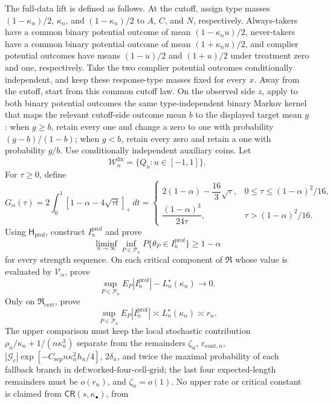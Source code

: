 The full-data lift is defined as follows.  At the cutoff, assign type
masses \((1-\kappa_n)/2\), \(\kappa_n\), and
\((1-\kappa_n)/2\) to \(A\), \(C\), and \(N\), respectively.
Always-takers have a common binary potential outcome of mean
\((1-\kappa_nu)/2\), never-takers have a common binary potential outcome
of mean \((1+\kappa_nu)/2\), and complier potential outcomes have means
\((1-u)/2\) and \((1+u)/2\) under treatment zero and one, respectively.
Take the two complier potential outcomes conditionally independent, and
keep these response-type masses fixed for every \(x\).  Away from the
cutoff, start from this common cutoff law.  On the observed
side \(z\), apply to both binary potential outcomes the same
type-independent binary Markov kernel that maps the relevant cutoff-side
outcome mean \(b\) to the displayed target mean \(g\): when \(g\ge b\),
retain every one and change a zero to one with probability
\((g-b)/(1-b)\); when \(g<b\), retain every zero and retain a one with
probability \(g/b\).  Use conditionally independent auxiliary coins.
Let
\[
 \mathcal W_n^{\mathrm{fix}}=\{Q_u:u\in[-1,1]\}.
\]
For \(\tau\ge0\), define
\[
 G_\alpha(\tau)
 =2\int_0^1[1-\alpha-4\sqrt{\tau t}]_+\,dt
 =\begin{cases}
 2(1-\alpha)-\dfrac{16}{3}\sqrt\tau,
   &0\le\tau\le(1-\alpha)^2/16,\\[6pt]
 \dfrac{(1-\alpha)^3}{24\tau},
   &\tau>(1-\alpha)^2/16.
 \end{cases}
\]
Using \(\mathsf H_{\mathrm{prof}}\), construct \(I_n^{\mathrm{prof}}\)
and prove
\[
 \liminf_{n\to\infty}\inf_{P\in\mathcal P_n}
 P\{\theta_P\in I_n^{\mathrm{prof}}\}\ge1-\alpha
\]
for every strength sequence.  On each critical component of
\(\mathfrak R\) whose value is evaluated by \(\mathcal V_\alpha\), prove
\[
 \sup_{P\in\mathcal P_n}E_P|I_n^{\mathrm{prof}}|
 -L_n^\star(\kappa_n)\longrightarrow0.
\]
Only on \(\mathfrak R_{\mathrm{cert}}\), prove
\[
 \sup_{P\in\mathcal P_n}E_P|I_n^{\mathrm{prof}}|
 \asymp L_n^\star(\kappa_n)\asymp r_n.
\]
The upper comparison must keep the local stochastic contribution
\(\rho_n/\kappa_n+1/(n\kappa_n^3)\) separate from the remainders
\(\zeta_n\), \(\varepsilon_{\mathrm{cont},n}\),
\(|\mathcal G_c|\exp[-C_{\mathrm{sep}}n\kappa_n^2h_n/4]\),
\(2\delta_n\), and twice the maximal probability of each fallback branch
in \(\text{def:worked-four-cell-grid}\); the last four expected-length
remainders must be \(o(r_n)\), and \(\zeta_n=o(1)\).  No upper rate or
critical constant is claimed from \(\mathsf{CR}(s,\kappa_\bullet)\), from

